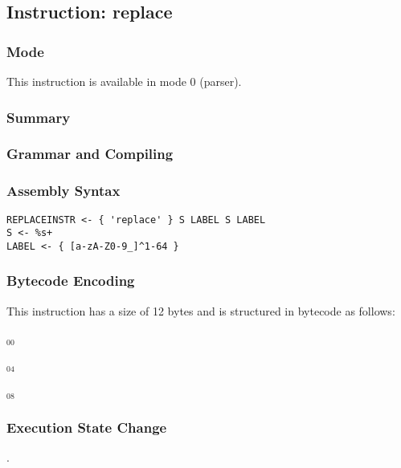 \subsection{Instruction: replace}

\subsubsection{Mode}
This instruction is available in mode 0 (parser).
\subsubsection{Summary}


\subsubsection{Grammar and Compiling}


\subsubsection{Assembly Syntax}

\begin{myquote}
\begin{verbatim}
REPLACEINSTR <- { 'replace' } S LABEL S LABEL
S <- %s+
LABEL <- { [a-zA-Z0-9_]^1-64 }
\end{verbatim}
\end{myquote}

\subsubsection{Bytecode Encoding}

This instruction has a size of 12 bytes and is structured in bytecode as follows:

$_{00}$\ 



$_{04}$\ 



$_{08}$\ 
\fbox{%
  \parbox{20pt}{%
00
  }%
}


\subsubsection{Execution State Change}

.


